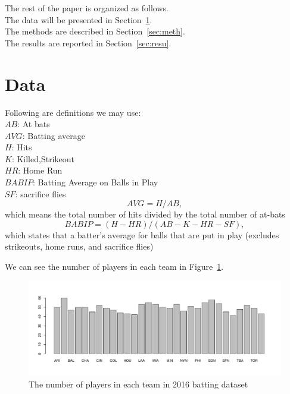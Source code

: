 \documentclass[12pt]{article}
\begin{document}
The rest of the paper is organized as follows.\\
The data will be presented in Section~\ref{sec:data}.\\
The methods are described in Section~\ref{sec:meth}.\\
The results are reported in Section~\ref{sec:resu}.\\



\section{Data}
\label{sec:data}
Following are definitions we may use:\\
$AB$: At bats\\ 
$AVG$: Batting average\\ 
$H$: Hits\\
$K$: Killed,Strikeout \\
$HR$: Home Run\\
$BABIP$: Batting Average on Balls in Play\\
$SF$: sacrifice flies\\
\begin{equation}
  \label{eq:AVG}
  AVG = H/AB,
\end{equation}
which means the total number of hits divided by the total number of at-bats
\begin{equation}
  \label{eq:BABIP}
  BABIP = (H - HR) / (AB - K - HR - SF),
\end{equation}
which states that a batter's average for balls that are put in play (excludes strikeouts, home runs, and sacrifice flies)


We can see the number of players in each team in Figure~\ref{fig:team}.
\graphicspath{{images/}}

\begin{figure}[tbp]
  \centering
  \includegraphics[width=\textwidth]{baseball team.pdf}
  \caption{The number of players in each team in 2016 batting dataset}
  \label{fig:team}
\end{figure}
\end{document}

